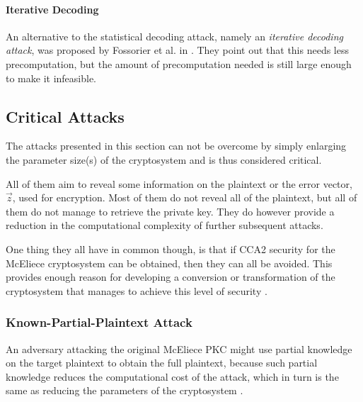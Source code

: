 \paragraph{Iterative Decoding}
\label{par:iteDec}

An alternative to the statistical decoding attack, namely an \emph{iterative decoding attack}, was proposed by Fossorier et al. in \cite{FKI}. They point out that this needs less precomputation, but the amount of precomputation needed is still large enough to make it infeasible.



\subsection{Critical Attacks}
\label{subsec:critAtt}

The attacks presented in this section can not be overcome by simply enlarging the parameter size(s) of the cryptosystem and is thus considered critical.

All of them aim to reveal some information on the plaintext or the error vector, $\vec{z}$, used for encryption. Most of them do not reveal all of the plaintext, but all of them do not manage to retrieve the private key. They do however provide a reduction in the computational complexity of further subsequent attacks.

One thing they all have in common though, is that if CCA2 security for the McEliece cryptosystem can be obtained, then they can all be avoided. This provides enough reason for developing a conversion or transformation of the cryptosystem that manages to achieve this level of security \cite{EOS,KI}.



\subsubsection{Known-Partial-Plaintext Attack}
\label{subsubsec:knoParPlaAtt}

An adversary attacking the original McEliece PKC might use partial knowledge on the target plaintext to obtain the full plaintext, because such partial knowledge reduces the computational cost of the attack, which in turn is the same as reducing the parameters of the cryptosystem \cite{CS}.

